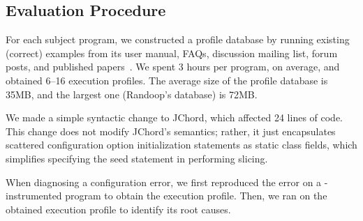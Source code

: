 

\vspace{-2mm}
\subsection{Evaluation Procedure}
\vspace{-1mm}

For each subject program, we constructed a profile database
by running existing (correct) examples from its user manual,
FAQs, discussion mailing list, forum posts,
and published papers~\cite{PachecoLET2007, Rabkin:2011:PPC}.
We spent 3 hours per program, on average, and obtained 6--16 execution profiles.
The average size of the profile database is 35MB, and the largest one
(Randoop's database) is 72MB.

We made a simple syntactic change to JChord, which affected 24 
lines of code. This change
does not modify JChord's semantics; rather, it just encapsulates
scattered configuration option initialization statements 
as static class fields, which simplifies specifying the seed statement
in performing slicing. 





When diagnosing a configuration error, we first reproduced the
error on a \ourtool-instrumented program to obtain the
execution profile. Then, we ran \ourtool on the obtained execution profile
to identify its root causes.

